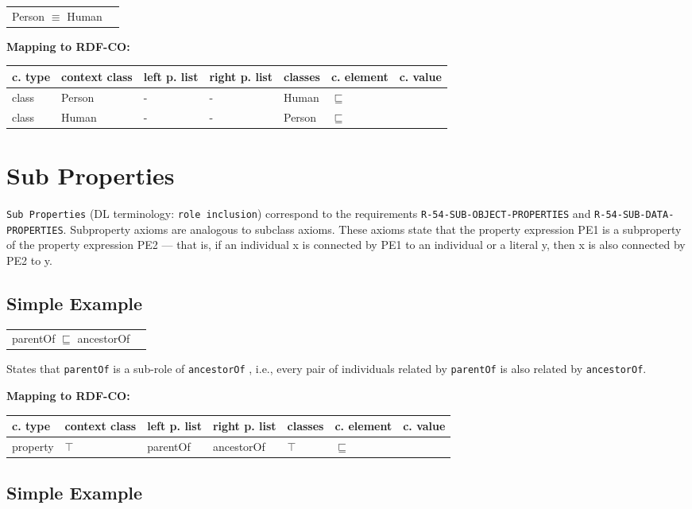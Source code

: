 \documentclass{llncs}
\newcommand{\ms}[1]{\texttt{#1}}
\newenvironment{gcotable}{
  \scriptsize
  \sffamily
  \vspace{0cm}
	\begin{center}
	\textbf{\vspace{0.4cm}Mapping to RDF-CO:} \\
  \begin{tabular}{l|l|l|l|l|l|l}
	\hline
  \textbf{c. type} & \textbf{context class} & \textbf{left p. list} & \textbf{right p. list} & \textbf{classes} & \textbf{c. element} & \textbf{c. value} \\
  \hline

}{
  \hline
  \end{tabular}
	\end{center}
}
\newenvironment{DL}{
  \vspace{0cm}
	\begin{center}
  \begin{tabular}{r l}

}{
  \end{tabular}
	\end{center}
}
\begin{document}
\begin{DL}
Person $\equiv$ Human
\end{DL}

\begin{gcotable}
class & Person & - & - & Human & $\sqsubseteq$ \\
class & Human & - & - & Person & $\sqsubseteq$ \\
\end{gcotable}

\section{Sub Properties}

\ms{Sub Properties} (DL terminology: \ms{role inclusion}) correspond to the requirements \ms{R-54-SUB-OBJECT-PROPERTIES} and \ms{R-54-SUB-DATA-PROPERTIES}.
Subproperty axioms are analogous to subclass axioms.
These axioms state that the property expression PE1 is a subproperty of the property expression PE2 — that is, if an individual x is connected by PE1 to an individual or a literal y, then x is also connected by PE2 to y. 

\subsection{Simple Example}

\begin{DL}
parentOf $\sqsubseteq$ ancestorOf 
\end{DL}

States that \ms{parentOf} is a sub-role of \ms{ancestorOf} , i.e., every pair of individuals related by \ms{parentOf} is also related by \ms{ancestorOf}.

\begin{gcotable}
property & $\top$ & parentOf & ancestorOf & $\top$ & $\sqsubseteq$ \\
\end{gcotable}



\subsection{Simple Example}
\end{document}
